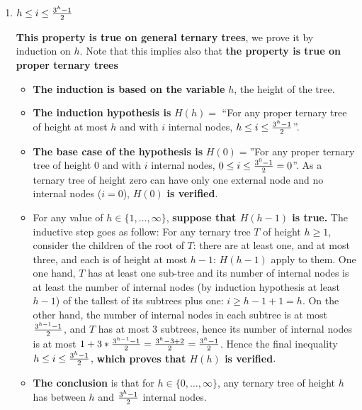\begin{enumerate}

\item $h\leq i \leq {3^h-1\over 2}$
\begin{solution}

{\bf This property is true on general ternary trees}, we prove it by
induction on $h$. Note that this implies also that {\bf the property
is true on proper ternary trees}

\begin{itemize}

\item {\bf The induction is based on the variable} $h$, the height of
the tree.

\item {\bf The induction hypothesis is} $H(h)=$ ``For any proper
ternary tree of height at most $h$ and with $i$ internal nodes,
%
$h\leq i \leq {3^h-1\over2}$''.

\item {\bf The base case of the hypothesis is} $H(0)=$''For any proper
ternary tree of height $0$ and with $i$ internal nodes,
$0\leq{i}\leq {3^0-1\over2}=0$''.
%
As a ternary tree of height zero can have only one external node and
no internal nodes ($i=0$), $H(0)$ {\bf is verified}.

\item For any value of $h\in\{1,\ldots,\infty\}$, {\bf suppose that
$H(h-1)$ is true.}  The inductive step goes as follow:
%
For any ternary tree $T$ of height $h\geq1$, consider the children of
the root of $T$: there are at least one, and at most three, and each
is of height at most $h-1$: $H(h-1)$ apply to them.
%
One one hand, $T$ has at least one sub-tree and its number of internal
nodes is at least the number of internal nodes (by induction
hypothesis at least $h-1$) of the tallest of its subtrees plus one:
$i\geq h-1+1=h$.
%
On the other hand, the number of internal nodes in each subtree is at
most ${3^{h-1}-1\over 2}$, and $T$ has at most $3$ subtrees, hence its
number of internal nodes is at most
$1+3*{3^{h-1}-1\over 2}
= {3^h-3+2\over2}
= {3^h-1\over2}$.
%
Hence the final inequality $h\leq i \leq {3^{h}-1\over 2}$, {\bf which
proves that $H(h)$ is verified}.

\item {\bf The conclusion} is that for $h\in\{0,\ldots,\infty\}$, any
ternary tree of height $h$ has between $h$ and ${3^h-1}\over2$ internal nodes.


\end{itemize}
\end{solution}
\end{enumerate}
